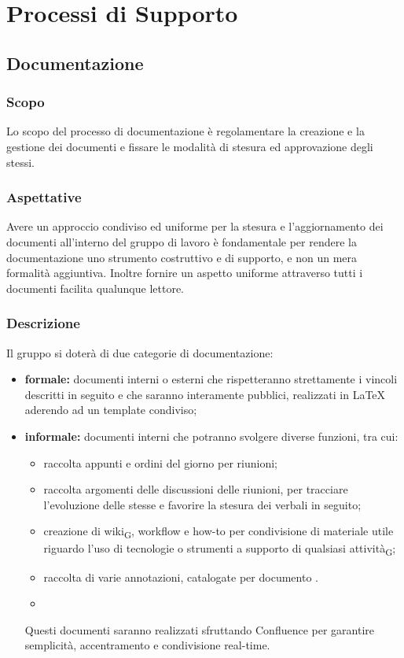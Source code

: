\section{Processi di Supporto}
\label{supporto}
\subsection{Documentazione}
    \subsubsection{Scopo}
    Lo scopo del processo di documentazione è regolamentare la creazione e la gestione dei documenti e fissare le modalità di stesura ed approvazione degli stessi.
    \subsubsection{Aspettative}
    Avere un approccio condiviso ed uniforme per la stesura e l'aggiornamento dei documenti all'interno del gruppo di lavoro è fondamentale per rendere la documentazione uno strumento costruttivo e di supporto, e non un mera formalità aggiuntiva.
    Inoltre fornire un aspetto uniforme attraverso tutti i documenti facilita qualunque lettore.
    \subsubsection{Descrizione}
    Il gruppo \group si doterà di due categorie di documentazione:
    \begin{itemize}
        \item \textbf{formale: }documenti interni o esterni che rispetteranno strettamente i vincoli descritti in seguito e che saranno interamente pubblici, realizzati in \LaTeX{} aderendo ad un template condiviso;
        \item \textbf{informale: }documenti interni che potranno svolgere diverse funzioni, tra cui:
        \begin{itemize}
            \item  raccolta appunti e ordini del giorno per riunioni;
            \item  raccolta argomenti delle discussioni delle riunioni, per tracciare l'evoluzione delle stesse e favorire la stesura dei verbali in seguito;
            \item  creazione di wiki\textsubscript{G}, workflow e how-to per condivisione di materiale utile riguardo l'uso di tecnologie o strumenti a supporto di qualsiasi attività\textsubscript{G};
            \item raccolta di varie annotazioni, catalogate per documento .
            \item 
        \end{itemize}
        Questi documenti saranno realizzati sfruttando Confluence per garantire semplicità, accentramento e condivisione real-time.

    \end{itemize}

